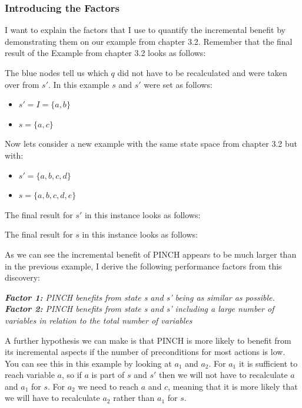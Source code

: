 \subsubsection{Introducing the Factors}
I want to explain the factors that I use to quantify the incremental benefit by demonstrating them on our example from chapter 3.2. Remember that the final result of the Example from chapter 3.2 looks as follows:


The blue nodes tell us which $q$ did not have to be recalculated and were taken over from $s'$. In this example $s$ and $s'$ were set as follows:
\begin{multicols}{2}
\begin{itemize}
\setlength\itemsep{0em}
\item $s' = I = \{a,b\}$
\item $s = \{a,c\}$
\end{itemize}
\end{multicols}
Now lets consider a new example with the same state space from chapter 3.2 but with:
\begin{center}
\begin{multicols}{2}
\begin{itemize}
\setlength\itemsep{0em}
\item $s' = \{a,b,c,d\}$
\item $s = \{a,b,c,d,e\}$
\end{itemize}
\end{multicols}
\end{center}
The final result for $s'$ in this instance looks as follows:

The final result for $s$ in this instance looks as follows: 

As we can see the incremental benefit of PINCH appears to be much larger than in the previous example, I derive the following performance factors from this discovery:
\begin{center}
\textit{\textbf{Factor 1:} PINCH benefits from state s and s' being as similar as possible.}\\
\textit{\textbf{Factor 2:} PINCH benefits from state s and s' including a large number of variables in relation to the total number of variables}\\
\end{center}
A further hypothesis we can make is that PINCH is more likely to benefit from its incremental aspects if the number of preconditions for most actions is low. You can see this in this example by looking at $a_1$ and $a_2$. For $a_1$ it is sufficient to reach variable $a$, so if $a$ is part of $s$ and $s'$ then we will not have to recalculate $a$ and $a_1$ for $s$. For $a_2$ we need to reach $a$ and $c$, meaning that it is more likely that we will have to recalculate $a_2$ rather than $a_1$ for $s$.
